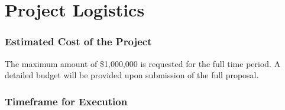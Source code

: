 \documentclass[11pt,letterpaper]{article}
\begin{document}
\part*{Project Logistics}
\section{Estimated Cost of the Project}                                                                    
The maximum amount of \$1,000,000 is requested for the full time period. A detailed budget will be provided upon submission of the full proposal.


\section{Timeframe for Execution}
\setlength{\LTpre}{-0.5cm}
\setlength{\arrayrulewidth}{0.3mm}
\end{document}
